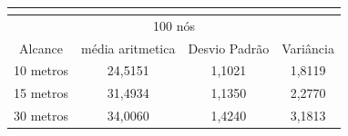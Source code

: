 \begin{table}[!htb]
\begin{minipage}{.5\linewidth}
\begin{tabular}{|c|c|c|c|}
			\multicolumn{4}{|c|}{} \\ \hline


			\multicolumn{4}{|c|}{100 nós} \\ \hline
			Alcance   & média aritmetica &	Desvio Padrão &	Variância  \\ \hline
			10 metros &	24,5151 & 1,1021 & 1,8119  \\ \hline
			15 metros &	31,4934 & 1,1350 & 2,2770  \\ \hline
			30 metros &	34,0060 & 1,4240 & 3,1813 \\ \hline

		\end{tabular}

	    \end{minipage} 
	\end{table}  